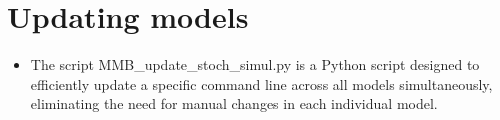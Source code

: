 \documentclass[10pt,a4paper]{article}
\begin{document}
 \section{Updating models}
\medskip
\begin{itemize}
	\item The script MMB_update_stoch_simul.py is a Python script designed to efficiently update a specific command line across all models simultaneously, eliminating the need for manual changes in each individual model.
 \end{itemize}

	
	
	
\end{document}
